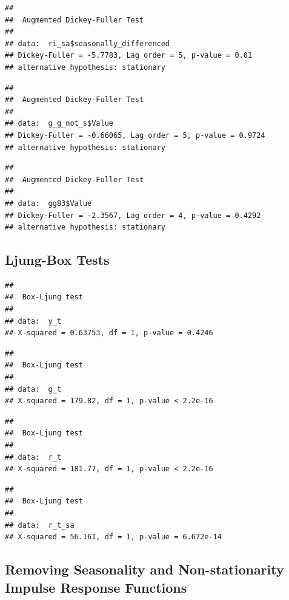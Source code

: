 \documentclass[11pt,preprint, authoryear]{elsarticle}
\numberwithin{equation}{section}
\numberwithin{figure}{section}
\numberwithin{table}{section}
\begin{document}
\begin{verbatim}
## 
##  Augmented Dickey-Fuller Test
## 
## data:  ri_sa$seasonally_differenced
## Dickey-Fuller = -5.7783, Lag order = 5, p-value = 0.01
## alternative hypothesis: stationary
\end{verbatim}

\begin{verbatim}
## 
##  Augmented Dickey-Fuller Test
## 
## data:  g_g_not_s$Value
## Dickey-Fuller = -0.66065, Lag order = 5, p-value = 0.9724
## alternative hypothesis: stationary
\end{verbatim}

\begin{verbatim}
## 
##  Augmented Dickey-Fuller Test
## 
## data:  gg83$Value
## Dickey-Fuller = -2.3567, Lag order = 4, p-value = 0.4292
## alternative hypothesis: stationary
\end{verbatim}

\hypertarget{ljung-box-tests}{%
\subsection{Ljung-Box Tests}\label{ljung-box-tests}}

\begin{verbatim}
## 
##  Box-Ljung test
## 
## data:  y_t
## X-squared = 0.63753, df = 1, p-value = 0.4246
\end{verbatim}

\begin{verbatim}
## 
##  Box-Ljung test
## 
## data:  g_t
## X-squared = 179.82, df = 1, p-value < 2.2e-16
\end{verbatim}

\begin{verbatim}
## 
##  Box-Ljung test
## 
## data:  r_t
## X-squared = 181.77, df = 1, p-value < 2.2e-16
\end{verbatim}

\begin{verbatim}
## 
##  Box-Ljung test
## 
## data:  r_t_sa
## X-squared = 56.161, df = 1, p-value = 6.672e-14
\end{verbatim}

\newpage

\hypertarget{removing-seasonality-and-non-stationarity-impulse-response-functions}{%
\subsection{Removing Seasonality and Non-stationarity Impulse Response
Functions}\label{removing-seasonality-and-non-stationarity-impulse-response-functions}}
\end{document}

